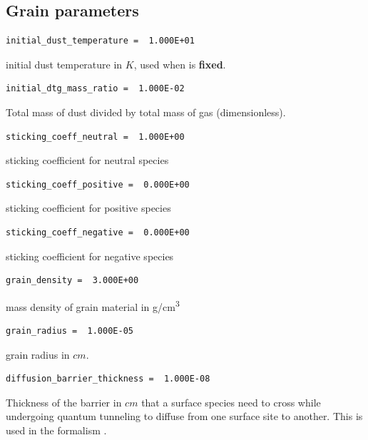 \documentclass[english,a4paper,twoside]{article}
\begin{document}
\subsection{Grain parameters}
\begin{verbatim}
initial_dust_temperature =  1.000E+01
\end{verbatim}
initial dust temperature in $\unit{K}$, used when  is \textbf{fixed}.

\begin{verbatim}
initial_dtg_mass_ratio =  1.000E-02
\end{verbatim}
Total mass of dust divided by total mass of gas (dimensionless).

\begin{verbatim}
sticking_coeff_neutral =  1.000E+00
\end{verbatim}
sticking coefficient for neutral species

\begin{verbatim}
sticking_coeff_positive =  0.000E+00
\end{verbatim}
sticking coefficient for positive species

\begin{verbatim}
sticking_coeff_negative =  0.000E+00
\end{verbatim}
sticking coefficient for negative species

\begin{verbatim}
grain_density =  3.000E+00
\end{verbatim}
mass density of grain material in \unit{g/cm^3}

\begin{verbatim}
grain_radius =  1.000E-05
\end{verbatim}
grain radius in $\unit{cm}$.

\begin{verbatim}
diffusion_barrier_thickness =  1.000E-08
\end{verbatim}
Thickness of the barrier in $\unit{cm}$ that a surface species need to cross while undergoing quantum tunneling to diffuse from one surface site to another. This is used in the formalism \citep[see equation 10 (parameter a)]{1992ApJS...82..167H}.
\end{document}

